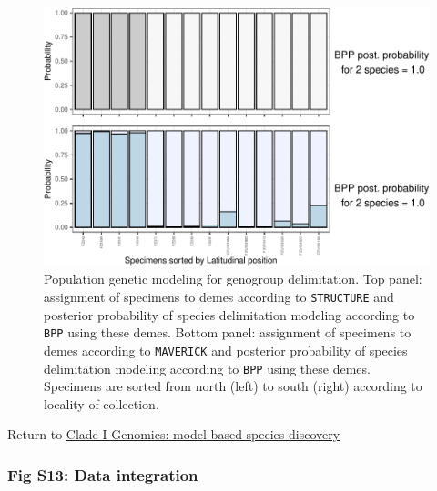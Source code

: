 \documentclass[
  11pt,
]{article}
\begin{document}
\begin{figure}
\includegraphics{Supplementary_Material_files/figure-latex/cladeImolecularDelimitationPopGenBpp-1} \caption{Population genetic modeling for genogroup delimitation. Top panel: assignment of specimens to demes according to \texttt{STRUCTURE} and posterior probability of species delimitation modeling according to \texttt{BPP} using these demes. Bottom panel: assignment of specimens to demes according to \texttt{MAVERICK} and posterior probability of species delimitation modeling according to \texttt{BPP} using these demes. Specimens are sorted from north (left) to south (right) according to locality of collection.}\label{fig:cladeImolecularDelimitationPopGenBpp}
\end{figure}

Return to \protect\hyperlink{model-based-species-discovery-1}{Clade I Genomics: model-based species discovery}
\pagebreak

\hypertarget{fig-s13-data-integration}{%
\subsubsection{Fig S13: Data integration}\label{fig-s13-data-integration}}
\end{document}
